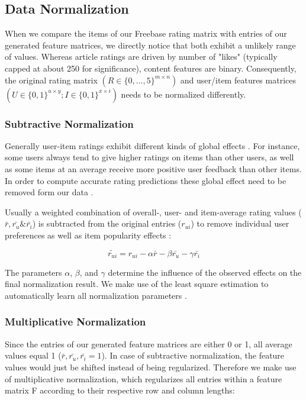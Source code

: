 \documentclass[11pt,letterpaper]{article}
\begin{document}
\subsection{Data Normalization}
When we compare the items of our Freebase rating matrix with entries of our generated feature matrices, we directly notice that both exhibit a unlikely range of values. Whereas article ratings are driven by number of "likes" (typically capped at about 250 for significance), content features are binary. Consequently, the original rating matrix $(R\in \{0,...,5\}^{m\times n})$ and user/item features matrices $(U\in \{0,1\}^{u\times y};I\in\{0,1\}^{x\times i})$ needs to be normalized differently.

\subsubsection{Subtractive Normalization}

Generally user-item ratings exhibit different kinds of global effects \cite{2, 4}. For instance, some users always tend to give higher ratings on items than other users, as well as some items at an average receive more positive user feedback than other items. In order to compute accurate rating predictions these global effect need to be removed form our data \cite{12}.

Usually a weighted combination of overall-, user- and item-average rating values ($\bar{r},\bar{r_u} \& \bar{r_i}$) is subtracted from the original entries ($r_{ui}$) to remove individual user preferences as well as item popularity effects \cite{10, 6, 8}:

$$\widetilde{r_{ui}} = r_{ui} - \alpha\bar{r} - \beta\bar{r_u} - \gamma\bar{r_i}$$

The parameters $\alpha$, $\beta$, and $\gamma$ determine the influence of the observed effects on the final normalization result. We make use of the least square estimation to automatically learn all normalization parameters \cite{4,12}.

\subsubsection{Multiplicative Normalization}

Since the entries of our generated feature matrices are either 0 or 1, all average values equal 1 ($\bar{r},\bar{r_u},\bar{r_i} = 1$). In case of subtractive normalization, the feature values would just be shifted instead of being regularized. Therefore we make use of multiplicative normalization, which regularizes all entries within a feature matrix F according to their respective row and column lengths:
\end{document}
